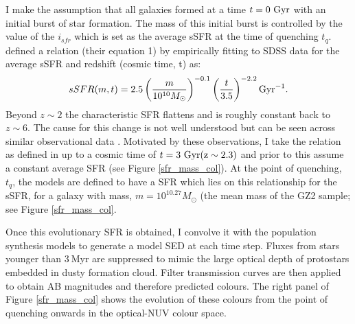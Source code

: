 \documentclass{mn2e}
\begin{document}
I make the assumption that all galaxies formed at a time $t=0~\rm{Gyr}$ with an initial burst of star formation. The mass of this initial burst is controlled by the value of the $i_{sfr}$ which is set as the average sSFR at the time of quenching $t_q$. \citet{Peng} defined a relation (their equation 1) by empirically fitting to SDSS data for the average sSFR and redshift (cosmic time, t) as:
\begin{equation}
sSFR(m,t) = 2.5 \left( \frac{m}{10^{10} M_{\odot}} \right)^{-0.1} \left(\frac{t}{3.5}\right)^{-2.2} \rm{Gyr}^{-1}.
\end{equation}
Beyond $z \sim 2$ the characteristic SFR flattens and is roughly constant back to $z\sim6$. The cause for this change is not well understood but can be seen across similar observational data \citep{Peng, Gonzalez, Beth}. Motivated by these observations, I take the relation as defined in \citet{Peng} up to a cosmic time of $t=3~\rm{Gyr} (z \sim 2.3)$ and prior to this assume a constant average SFR (see Figure \ref{sfr_mass_col}). At the point of quenching, $t_{q}$, the models are defined to have a SFR which lies on this relationship for the sSFR, for a galaxy with mass, $m = 10^{10.27} M_{\odot}$ (the mean mass of the GZ2 sample; see Figure \ref{sfr_mass_col}.
 

Once this evolutionary SFR is obtained, I convolve it with the \citet{BC03} population synthesis models to generate a model SED at each time step. Fluxes from stars younger than $3~$Myr are suppressed to mimic the large optical depth of protostars embedded in dusty formation cloud. Filter transmission curves are then applied to obtain AB magnitudes and therefore predicted colours. The right panel of Figure \ref{sfr_mass_col} shows the evolution of these colours from the point of quenching onwards in the optical-NUV colour space.
\end{document}
